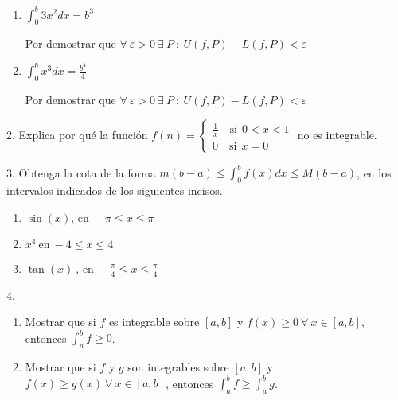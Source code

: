 \documentclass[12pt]{article}
\begin{document}
\begin{enumerate}[\hspace{9px} a)]
\begin{proof}[Prueba:]
        \[sup\{L(f,P)\}=inf\{U(f,P)\}=\frac{b^3}{6}\]

        \textbf{$\therefore \ f$ es integrable en [0,b] y} \(\displaystyle\int_{0}^{b}\frac{x^2}{2}dx=\frac{b^3}{6}\)

    \end{proof}
    
    \item \(\displaystyle\int_{0}^{b}3x^2dx=b^3\)\medskip
    
    Por demostrar que \(\forall \ \varepsilon>0 \ \exists \ P \ : \ U(f,P)-L(f,P)<\varepsilon\)
    
    \item \(\displaystyle\int_{0}^{b}x^3dx=\frac{b^4}{4}\)\medskip
    
    Por demostrar que \(\forall \ \varepsilon>0 \ \exists \ P \ : \ U(f,P)-L(f,P)<\varepsilon\)
    
\end{enumerate}

2. Explica por qu\'e la funci\'on 
\(f(n)=
\begin{cases}
    \displaystyle\frac{1}{x} \quad \text{si} \ \ 0<x<1\\
    0 \quad \text{si} \ \ x=0
\end{cases}
\) no es integrable.

3. Obtenga la cota de la forma \(m(b-a) \leq \displaystyle\int_{0}^{b}f(x)dx \leq M(b-a)\), en los intervalos indicados de los siguientes incisos.

\begin{enumerate}[\hspace{9px} a)]
    \item \(\sin(x) \text{, en} \ -\pi \leq x \leq \pi\)
    
    \item \(x^4 \ \text{en} \ -4 \leq x \leq 4\)
    
    \item \(\tan(x) \ \text{, en} \ -\frac{\pi}{4} \leq x \leq \frac{\pi}{4}\)
    
\end{enumerate}

4.
\begin{enumerate}[\hspace{9px} a)]
    \item Mostrar que si $f$ es integrable sobre $[a,b]$ y \(f(x) \geq 0 \ \forall \ x \in [a,b]\), entonces \(\displaystyle\int_{a}^{b}f \geq 0\).
    
    \item Mostrar que si $f$ y $g$ son integrables sobre $[a,b]$ y \(f(x) \geq g(x) \ \forall \ x \in [a,b]\), entonces \(\displaystyle\int_{a}^{b}f \geq \displaystyle\int_{a}^{b}g\).

\end{enumerate}
\end{document}

